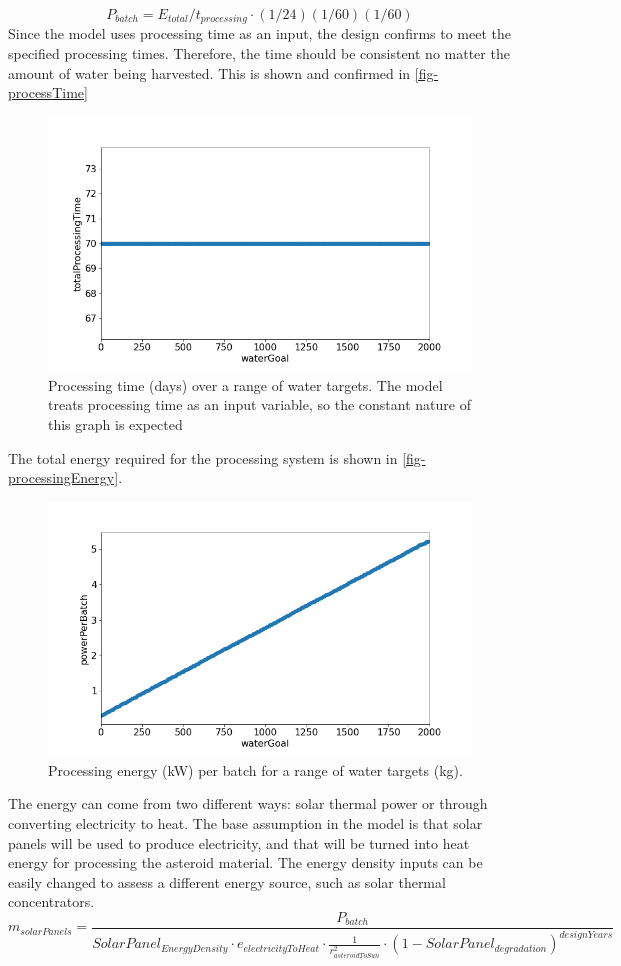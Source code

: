\begin{equation}
    P_{batch} = E_{total} / t_{processing} \cdot (1/24)(1/60)(1/60)
\end{equation}
Since the model uses processing time as an input, the design confirms to meet the specified processing times. Therefore, the time should be consistent no matter the amount of water being harvested. This is shown and confirmed in \autoref{fig-processTime}
\begin{figure}[htb]
    \centering
    \includegraphics[width=0.5\linewidth]{processTime_vs_waterGoal.png}
    \captionsetup{justification=centering,margin=2cm}
    \caption{Processing time (days) over a range of water targets. The model treats processing time as an input variable, so the constant nature of this graph is expected}
    \label{fig-processTime}
\end{figure}


The total energy required for the processing system is shown in \autoref{fig-processingEnergy}.
\begin{figure}[htb]
    \centering
    \includegraphics[width=0.5\linewidth]{powerPerBatch_vs_waterGoal.png}
    \caption{Processing energy (kW) per batch for a range of water targets (kg). }
    \captionsetup{justification=centering,margin=2cm}
    \label{fig-processingEnergy}
\end{figure}

The energy can come from two different ways: solar thermal power or through converting electricity to heat. The base assumption in the model is that solar panels will be used to produce electricity, and that will be turned into heat energy for processing the asteroid material. The energy density inputs can be easily changed to assess a different energy source, such as solar thermal concentrators. 
\begin{equation}
    m_{solarPanels} = \frac{P_{batch}}{SolarPanel_{EnergyDensity}\cdot e_{electricityToHeat} \cdot \frac{1}{r_{asteroidToSun}^2} \cdot (1 - SolarPanel_{degradation})^{designYears}}  
\end{equation}

